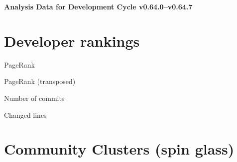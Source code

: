 \documentclass{article}
\begin{document}
\setlength{\parindent}{0pt}
\begin{center}
\begin{Large}
\textbf{Analysis Data for Development Cycle v0.64.0--v0.64.7}
\end{Large}
\end{center}
\section{Developer rankings}
\begin{small}\renewcommand{\tabcolsep}{1pt}
\begin{minipage}{0.5\linewidth}
PageRank\\

\end{minipage}%
\begin{minipage}{0.5\linewidth}
PageRank (transposed)\\

\end{minipage}

\renewcommand{\tabcolsep}{5pt}
\begin{minipage}{0.5\linewidth}
Number of commits\\

\end{minipage}%
\begin{minipage}{0.5\linewidth}
Changed lines\\

\end{minipage}
\end{small}
\newpage\section{Community Clusters (spin glass)}
\end{document}
